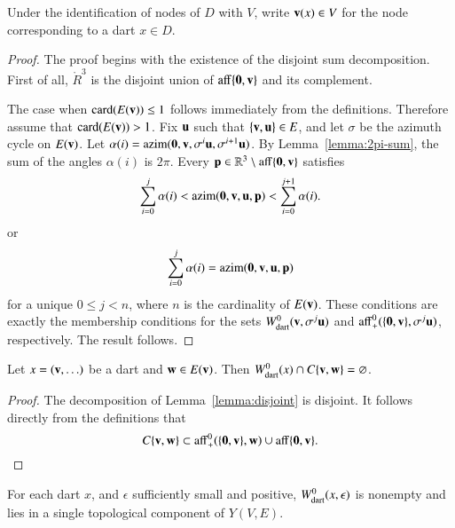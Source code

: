 \begin{definition}[$\v(x)$]
Under the identification of nodes of $D$ with $V$,
write ${\mathbf v}(x)\in V$ for the node corresponding to a dart $x\in D$. 
\end{definition}

\begin{proof}
The proof begins with the existence of the disjoint sum decomposition.
First of all, $\ring{R}^3$ is the disjoint union of ${\operatorname{aff}}\{{\mathbf 0},{\mathbf v}\}$
and its complement.

The case when ${\operatorname{card}}(E({\mathbf v}))\le 1$ follows immediately from the definitions.  
Therefore assume  that ${\operatorname{card}}(E({\mathbf v})) >1$.
Fix ${\mathbf u}$ such that $\{{\mathbf v},{\mathbf u}\}\in E$, and let $\sigma$ be the azimuth
cycle on $E({\mathbf v})$.  Let $\alpha(i)={\operatorname{azim}}({\mathbf 0},{\mathbf v},\sigma^i {\mathbf u},\sigma^{i+1}{\mathbf u})$.   By Lemma~\ref{lemma:2pi-sum}, the sum of the angles $\alpha(i)$ is $2\pi$.  Every ${\mathbf p}\in\mathbb{R}^3\setminus{\operatorname{aff}}\{{\mathbf 0},{\mathbf v}\}$ satisfies
$$
\sum_{i=0}^j \alpha(i) <
{\operatorname{azim}}({\mathbf 0},{\mathbf v},{\mathbf u},{\mathbf p}) < \sum_{i=0}^{j+1} \alpha(i).
$$
or 
$$
\sum_{i=0}^j \alpha(i) = {\operatorname{azim}}({\mathbf 0},{\mathbf v},{\mathbf u},{\mathbf p})
$$
for a unique $0 \le j < n$, where $n$ is the cardinality of $E({\mathbf v})$. 
These conditions are exactly the membership conditions for the sets
$
W^0_{\text{dart}}({\mathbf v},\sigma^j {\mathbf u})
$
and ${\operatorname{aff}}_+^0(\{{\mathbf 0},{\mathbf v}\},\sigma^j {\mathbf u})$, respectively.
The result follows.
\end{proof}

\begin{corollary}
Let $x = ({\mathbf v},\ldots)$ be a dart and ${\mathbf w}\in E({\mathbf v})$.
Then $W^0_{\text{dart}}(x)\cap C\{{\mathbf v},{\mathbf w}\}=\varnothing$.
\end{corollary}

\begin{proof} The decomposition of Lemma~\ref{lemma:disjoint} is
disjoint.  It follows directly from the definitions that
   $$C\{{\mathbf v},{\mathbf w}\}\subset {\operatorname{aff}}_+^0(\{{\mathbf 0},{\mathbf v}\},{\mathbf w}) \cup 
    {\operatorname{aff}}\{{\mathbf 0},{\mathbf v}\}.$$
\end{proof}

\begin{lemma} 
For each dart $x$, and $\epsilon$ sufficiently small and positive,
$W^0_{\text{dart}}(x,\epsilon)$ is nonempty and lies in a single 
topological component of $Y(V,E)$.
\end{lemma}
%
%

